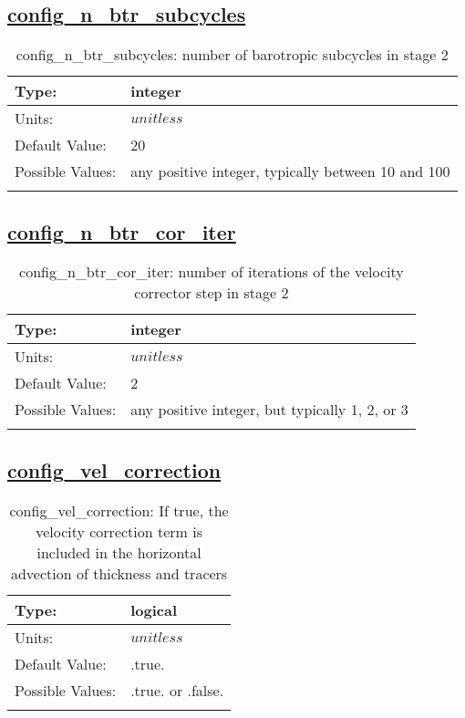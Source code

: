 \subsection[config\_n\_btr\_subcycles]{\hyperref[sec:nm_tab_split_explicit_ts]{config\_n\_btr\_subcycles}}
\label{subsec:nm_sec_config_n_btr_subcycles}
\begin{center}
\begin{longtable}{| p{2.0in} | p{4.0in} |}
    \hline
    Type: & integer \\
    \hline
    Units: & $unitless$ \\
    \hline
    Default Value: & 20 \\
    \hline
    Possible Values: & any positive integer, typically between 10 and 100 \\
    \hline
    \caption{config\_n\_btr\_subcycles: number of barotropic subcycles in stage 2}
\end{longtable}
\end{center}
\subsection[config\_n\_btr\_cor\_iter]{\hyperref[sec:nm_tab_split_explicit_ts]{config\_n\_btr\_cor\_iter}}
\label{subsec:nm_sec_config_n_btr_cor_iter}
\begin{center}
\begin{longtable}{| p{2.0in} | p{4.0in} |}
    \hline
    Type: & integer \\
    \hline
    Units: & $unitless$ \\
    \hline
    Default Value: & 2 \\
    \hline
    Possible Values: & any positive integer, but typically 1, 2, or 3 \\
    \hline
    \caption{config\_n\_btr\_cor\_iter: number of iterations of the velocity corrector step in stage 2}
\end{longtable}
\end{center}
\subsection[config\_vel\_correction]{\hyperref[sec:nm_tab_split_explicit_ts]{config\_vel\_correction}}
\label{subsec:nm_sec_config_vel_correction}
\begin{center}
\begin{longtable}{| p{2.0in} | p{4.0in} |}
    \hline
    Type: & logical \\
    \hline
    Units: & $unitless$ \\
    \hline
    Default Value: & .true. \\
    \hline
    Possible Values: & .true. or .false. \\
    \hline
    \caption{config\_vel\_correction: If true, the velocity correction term is included in the horizontal advection of thickness and tracers}
\end{longtable}
\end{center}
